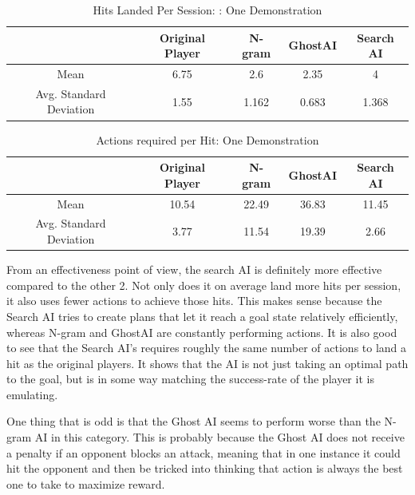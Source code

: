 \begin{table}[h]
	\centering
	\caption{Hits Landed Per Session: : One Demonstration }
	\begin{tabular}	{| c | c | c | c | c | }
		\hline
		& Original Player & N-gram & GhostAI & Search AI \\
		\hline
		Mean &
		6.75 & 2.6 & 2.35 & 4\\
		\hline
		Avg. Standard Deviation &
		1.55 & 1.162 & 0.683 & 1.368\\
		\hline
	\end{tabular}
	\label{Effectiveness1}
\end{table}


\begin{table}[h]
	\centering
	\caption{Actions required per Hit:  One Demonstration }
	\begin{tabular}	{| c | c | c | c | c | }
		\hline
		& Original Player & N-gram & GhostAI & Search AI \\
		\hline
		Mean &
		10.54 & 22.49 & 36.83 & 11.45\\
		\hline
		Avg. Standard Deviation &
		3.77 & 11.54 & 19.39 & 2.66\\
		\hline
	\end{tabular}
	\label{Effectiveness2}
\end{table}

From an effectiveness point of view, the search AI is definitely more effective compared to the other 2. Not only does it on average land more hits per session, it also uses fewer actions to achieve those hits. This makes sense because the Search AI tries to create plans that let it reach a goal state relatively efficiently, whereas N-gram and GhostAI are constantly performing actions. It is also good to see that the Search AI's requires roughly the same number of actions to land a hit as the original players. It shows that the AI is not just taking an optimal path to the goal, but is in some way matching the success-rate of the player it is emulating. 

One thing that is odd is that the Ghost AI seems to perform worse than the N-gram AI in this category. This is probably because the Ghost AI does not receive a penalty if an opponent blocks an attack, meaning that in one instance it could hit the opponent and then be tricked into thinking that action is always the best one to take to maximize reward.

